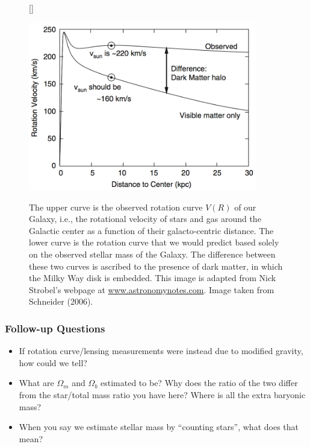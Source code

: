 \documentclass[a4paper,11pt]{article}
\begin{document}
\begin{figure}[t]
    [\FBwidth]
    {\caption{\footnotesize{The upper curve is the observed rotation curve $V(R)$ of our Galaxy, i.e., the rotational velocity of stars and gas around the Galactic center as a function of their galacto-centric distance. The lower curve is the rotation curve that we would predict based solely on the observed stellar mass of the Galaxy. The difference between these two curves is ascribed to the presence of dark matter, in which the Milky Way disk is embedded. This image is adapted from Nick Strobel's webpage at \href{www.astronomynotes.com}{www.astronomynotes.com}. Image taken from Schneider (2006).}}
    \label{fig:rotationcurve}}
    {\includegraphics[width=10cm]{figures/RotationCurve.png}}
\end{figure}

\newpage
\subsubsection{Follow-up Questions}

\begin{itemize}
    \item If rotation curve/lensing measurements were instead due to modified gravity, how could we tell?
    \item What are $\Omega_m$ and $\Omega_b$ estimated to be? Why does the ratio of the two differ from the star/total mass ratio you have here? Where is all the extra baryonic mass?
    \item When you say we estimate stellar mass by ``counting stars'', what does that mean?
\end{itemize}

\end{document}
